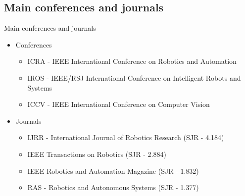\subsection{Main conferences and journals}
\begin{frame}{Main conferences and journals}
	\begin{itemize}
		\item Conferences
		\begin{itemize}
			\item ICRA - IEEE International Conference on Robotics and Automation
			\item IROS - IEEE/RSJ International Conference on Intelligent Robots and Systems
			\item ICCV - IEEE International Conference on Computer Vision
		\end{itemize}
		\item Journals
		\begin{itemize}
			\item IJRR - International Journal of Robotics Research (SJR - 4.184)
			\item IEEE Transactions on Robotics (SJR - 2.884)
			\item IEEE Robotics and Automation Magazine (SJR - 1.832)
			\item RAS - Robotics and Autonomous Systems (SJR - 1.377)
		\end{itemize}
	\end{itemize}

\end{frame}

